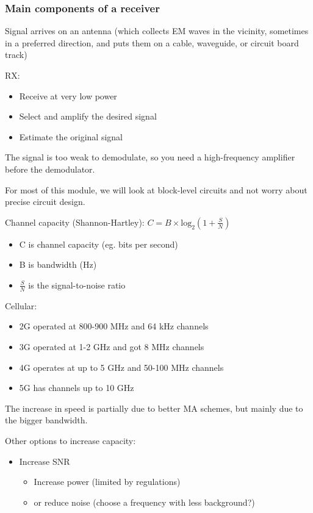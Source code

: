\documentclass[12pt]{article}
\begin{document}
\subsubsection{Main components of a receiver}
Signal arrives on an antenna (which collects EM waves in the vicinity, sometimes in a preferred direction, and puts them on a cable, waveguide, or circuit board track)

RX:
\begin{itemize}[noitemsep]
    \item Receive at very low power
    \item Select and amplify the desired signal
    \item Estimate the original signal
\end{itemize}

The signal is too weak to demodulate, so you need a high-frequency amplifier before the demodulator.

For most of this module, we will look at block-level circuits and not worry about precise circuit design.

Channel capacity (Shannon-Hartley):
\begin{math}
C = B \times\text{log}_2(1+\frac{S}{N})
\end{math}

\begin{itemize}[noitemsep]
    \item C is channel capacity (eg. bits per second)
    \item B is bandwidth (Hz)
    \item $\frac{S}{N}$ is the signal-to-noise ratio
\end{itemize}

Cellular:
\begin{itemize}[noitemsep]
    \item 2G operated at 800-900 MHz and 64 kHz channels
    \item 3G operated at 1-2 GHz and got 8 MHz channels
    \item 4G operates at up to 5 GHz and 50-100 MHz channels
    \item 5G has channels up to 10 GHz
\end{itemize}
The increase in speed is partially due to better MA schemes, but mainly due to the bigger bandwidth.

Other options to increase capacity:
\begin{itemize}[noitemsep]
    \item Increase SNR
    \begin{itemize}[noitemsep]
        \item Increase power (limited by regulations)
        \item or reduce noise (choose a frequency with less background?)
    \end{itemize}
\end{itemize}
\end{document}
